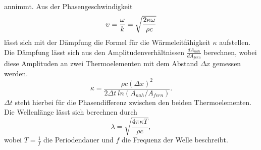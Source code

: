 annimmt.
Aus der Phasengeschwindigkeit
\begin{equation}
    \upsilon = \frac{\omega}{k} = \sqrt{\frac{2\kappa \omega}{\rho c}}
    \label{eqn:upsilon}\\
\end{equation} 
lässt sich mit der Dämpfung die Formel für die Wärmeleitfähigkeit $\kappa$ aufstellen. 
Die Dämpfung lässt sich aus den Amplitudenverhältnissen $\frac{dA_{nah}}{dA_{fern}}$ berechnen, wobei diese Amplituden an zwei Thermoelementen mit dem Abstand $\Delta x$ gemessen werden.
\begin{equation}
    \kappa =\frac{\rho c (\Delta x)^2}{2\Delta t \: ln(A_{nah}/A_{fern})}\label{eqn:kappa}.
\end{equation}
$\Delta t$ steht hierbei für die Phasendifferenz zwischen den beiden Thermoelementen.
Die Wellenlänge lässt sich berechnen durch 
\begin{equation}
  \label{eqn:welle}
  \lambda = \sqrt{\frac{4 \pi \kappa T}{\rho c}},
\end{equation}
wobei $T=\frac{1}{f}$ die Periodendauer und $f$ die Frequenz der Welle beschreibt.
